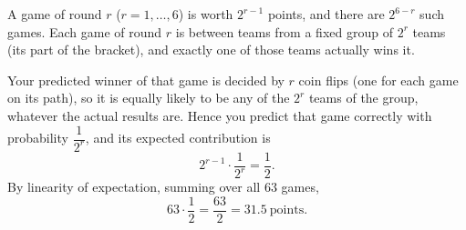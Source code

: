 A game of round $r$ ($r=1,\dots,6$) is worth $2^{r-1}$ points, and there are $2^{6-r}$ such games. Each game of round $r$ is between teams from a fixed group of $2^r$ teams (its part of the bracket), and exactly one of those teams actually wins it.

Your predicted winner of that game is decided by $r$ coin flips (one for each game on its path), so it is equally likely to be any of the $2^r$ teams of the group, whatever the actual results are. Hence you predict that game correctly with probability $\dfrac{1}{2^r}$, and its expected contribution is
\[2^{r-1}\cdot\dfrac{1}{2^r}=\dfrac{1}{2}.\]
By linearity of expectation, summing over all $63$ games,
\[63\cdot\dfrac{1}{2}=\boxed{\dfrac{63}{2}}=31.5\ \text{points}.\]
